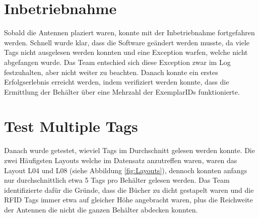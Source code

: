 \documentclass[parskip=full, a4paper]{scrartcl}
\begin{document}
\section{Inbetriebnahme}
Sobald die Antennen plaziert waren, konnte mit der Inbetriebnahme fortgefahren werden. Schnell wurde klar, dass die Software geändert werden musste, da viele Tags nicht ausgelesen werden konnten und eine Exception warfen, welche nicht abgefangen wurde. Das Team entschied sich diese Exception zwar im Log festzuhalten, aber nicht weiter zu beachten. Danach konnte ein erstes Erfolgserlebnis erreicht werden, indem verifiziert werden konnte, dass die Ermittlung der Behälter über eine Mehrzahl der ExemplarIDs funktionierte.

\section{Test Multiple Tags}
Danach wurde getestet, wieviel Tags im Durchschnitt gelesen werden konnte. Die zwei Häufigsten Layouts welche im Datensatz anzutreffen waren, waren das Layout L04 und L08 (siehe Abbildung \ref{fig:Layouts}), dennoch konnten anfangs nur durchschnittlich etwa 5 Tags pro Behälter gelesen werden. Das Team identifizierte dafür die Gründe, dass die Bücher zu dicht gestapelt waren und die RFID Tags immer etwa auf gleicher Höhe angebracht waren, plus die Reichweite der Antennen die nicht die ganzen Behälter abdecken konnten.
\end{document}

